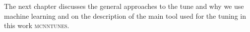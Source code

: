 
\medskip

The next chapter discusses the general approaches to the tune and why we use machine learning and on the description of the main tool used for the tuning in this work \textsc{mcnntunes}. 
